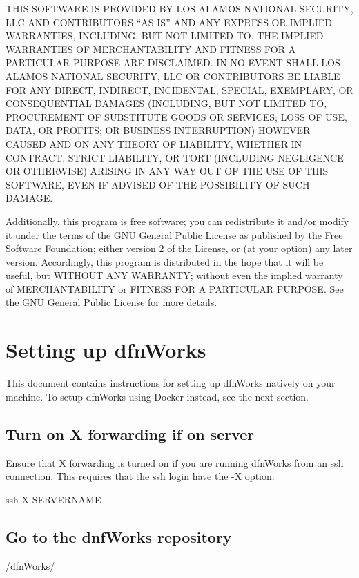 \documentclass[letterpaper,10pt,english]{sphinxmanual}
\begin{document}
THIS SOFTWARE IS PROVIDED BY LOS ALAMOS NATIONAL SECURITY, LLC AND
CONTRIBUTORS “AS IS” AND ANY EXPRESS OR IMPLIED WARRANTIES, INCLUDING, BUT NOT
LIMITED TO, THE IMPLIED WARRANTIES OF MERCHANTABILITY AND FITNESS FOR A
PARTICULAR PURPOSE ARE DISCLAIMED. IN NO EVENT SHALL LOS ALAMOS NATIONAL
SECURITY, LLC OR CONTRIBUTORS BE LIABLE FOR ANY DIRECT, INDIRECT, INCIDENTAL,
SPECIAL, EXEMPLARY, OR CONSEQUENTIAL DAMAGES (INCLUDING, BUT NOT LIMITED TO,
PROCUREMENT OF SUBSTITUTE GOODS OR SERVICES; LOSS OF USE, DATA, OR PROFITS; OR
BUSINESS INTERRUPTION) HOWEVER CAUSED AND ON ANY THEORY OF LIABILITY, WHETHER
IN CONTRACT, STRICT LIABILITY, OR TORT (INCLUDING NEGLIGENCE OR OTHERWISE)
ARISING IN ANY WAY OUT OF THE USE OF THIS SOFTWARE, EVEN IF ADVISED OF THE
POSSIBILITY OF SUCH DAMAGE.

Additionally, this program is free software; you can redistribute it and/or
modify it under the terms of the GNU General Public License as published by
the Free Software Foundation; either version 2 of the License, or (at your
option) any later version. Accordingly, this program is distributed in the
hope that it will be useful, but WITHOUT ANY WARRANTY; without even the
implied warranty of MERCHANTABILITY or FITNESS FOR A PARTICULAR PURPOSE.
See the GNU General Public License for more details.


\chapter{Setting up dfnWorks}
\label{\detokenize{setup:setting-up-dfnworks}}\label{\detokenize{setup::doc}}
This document contains instructions for setting up dfnWorks natively on your
machine. To setup dfnWorks using Docker instead, see the next section.


\section{Turn on X forwarding if on server}
\label{\detokenize{setup:turn-on-x-forwarding-if-on-server}}
Ensure that X forwarding is turned on if you are running dfnWorks from an ssh connection. This requires that the ssh login have the -X option:

%
\begin{sphinxVerbatim}[commandchars=\\\{\}]
\PYGZdl{} ssh \PYGZhy{}X SERVER\PYGZus{}NAME
\end{sphinxVerbatim}


\section{Go to the dnfWorks repository}
\label{\detokenize{setup:go-to-the-dnfworks-repository}}
%
\begin{sphinxVerbatim}[commandchars=\\\{\}]
\PYGZdl{}  \PYGZti{}/dfnWorks/
\end{sphinxVerbatim}
\end{document}
